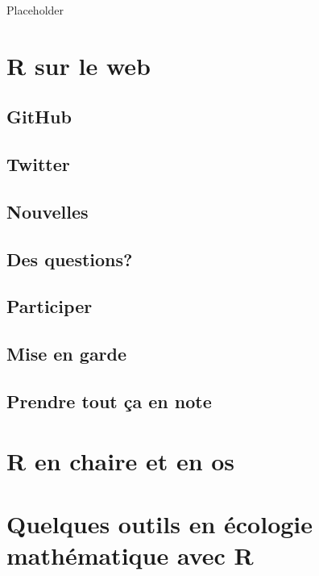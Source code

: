 \documentclass[]{book}
\begin{document}
Placeholder

\hypertarget{r-sur-le-web}{%
\section{R sur le web}\label{r-sur-le-web}}

\hypertarget{github}{%
\subsection{GitHub}\label{github}}

\hypertarget{twitter}{%
\subsection{Twitter}\label{twitter}}

\hypertarget{nouvelles}{%
\subsection{Nouvelles}\label{nouvelles}}

\hypertarget{des-questions}{%
\subsection{Des questions?}\label{des-questions}}

\hypertarget{participer}{%
\subsection{Participer}\label{participer}}

\hypertarget{mise-en-garde}{%
\subsection{Mise en garde}\label{mise-en-garde}}

\hypertarget{prendre-tout-uxe7a-en-note}{%
\subsection{Prendre tout ça en note}\label{prendre-tout-uxe7a-en-note}}

\hypertarget{r-en-chaire-et-en-os}{%
\section{R en chaire et en os}\label{r-en-chaire-et-en-os}}

\hypertarget{quelques-outils-en-uxe9cologie-mathuxe9matique-avec-r}{%
\section{Quelques outils en écologie mathématique avec
R}\label{quelques-outils-en-uxe9cologie-mathuxe9matique-avec-r}}
\end{document}
